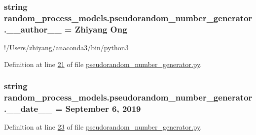 \subsubsection[{\+\_\+\+\_\+author\+\_\+\+\_\+}]{\setlength{\rightskip}{0pt plus 5cm}string random\+\_\+process\+\_\+models.\+pseudorandom\+\_\+number\+\_\+generator.\+\_\+\+\_\+author\+\_\+\+\_\+ = \textquotesingle{}Zhiyang Ong\textquotesingle{}}\label{namespacerandom__process__models_1_1pseudorandom__number__generator_a84092bcc9369063613d90d32f1b312c1}


!/\+Users/zhiyang/anaconda3/bin/python3 



Definition at line \hyperlink{pseudorandom__number__generator_8py_source_l00021}{21} of file \hyperlink{pseudorandom__number__generator_8py_source}{pseudorandom\+\_\+number\+\_\+generator.\+py}.

\hypertarget{namespacerandom__process__models_1_1pseudorandom__number__generator_a331fc6d6b9f620aa4f2c18a74db5cb07}{}
\subsubsection[{\+\_\+\+\_\+date\+\_\+\+\_\+}]{\setlength{\rightskip}{0pt plus 5cm}string random\+\_\+process\+\_\+models.\+pseudorandom\+\_\+number\+\_\+generator.\+\_\+\+\_\+date\+\_\+\+\_\+ = \textquotesingle{}September 6, 2019\textquotesingle{}}\label{namespacerandom__process__models_1_1pseudorandom__number__generator_a331fc6d6b9f620aa4f2c18a74db5cb07}


Definition at line \hyperlink{pseudorandom__number__generator_8py_source_l00023}{23} of file \hyperlink{pseudorandom__number__generator_8py_source}{pseudorandom\+\_\+number\+\_\+generator.\+py}.

\hypertarget{namespacerandom__process__models_1_1pseudorandom__number__generator_a86f3eea01762559cc8455c47914c636b}{}
